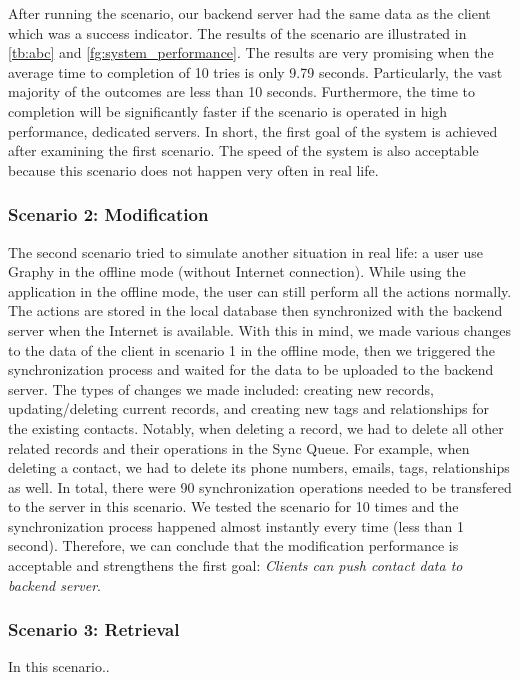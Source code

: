 After running the scenario, our backend server had the same data as the client which was a success indicator. The results of the scenario are illustrated in \autoref{tb:abc} and \autoref{fg:system_performance}. The results are very promising when the average time to completion of 10 tries is only 9.79 seconds. Particularly, the vast majority of the outcomes are less than 10 seconds. Furthermore, the time to completion will be significantly faster if the scenario is operated in high performance, dedicated servers. In short, the first goal of the system is achieved after examining the first scenario. The speed of the system is also acceptable because this scenario does not happen very often in real life. 

\subsubsection{Scenario 2: Modification}
The second scenario tried to simulate another situation in real life: a user use Graphy in the offline mode (without Internet connection). While using the application in the offline mode, the user can still perform all the actions normally. The actions are stored in the local database then synchronized with the backend server when the Internet is available. With this in mind, we made various changes to the data of the client in scenario 1 in the offline mode, then we triggered the synchronization process and waited for the data to be uploaded to the backend server. The types of changes we made included: creating new records, updating/deleting current records, and creating new tags and relationships for the existing contacts. Notably, when deleting a record, we had to delete all other related records and their operations in the Sync Queue. For example, when deleting a contact, we had to delete its phone numbers, emails, tags, relationships as well. In total, there were 90 synchronization operations needed to be transfered to the server in this scenario. We tested the scenario for 10 times and the synchronization process happened almost instantly every time (less than 1 second). Therefore, we can conclude that the modification performance is acceptable and strengthens the first goal: \textit{Clients can push contact data to backend server}.

\subsubsection{Scenario 3: Retrieval}
In this scenario..

